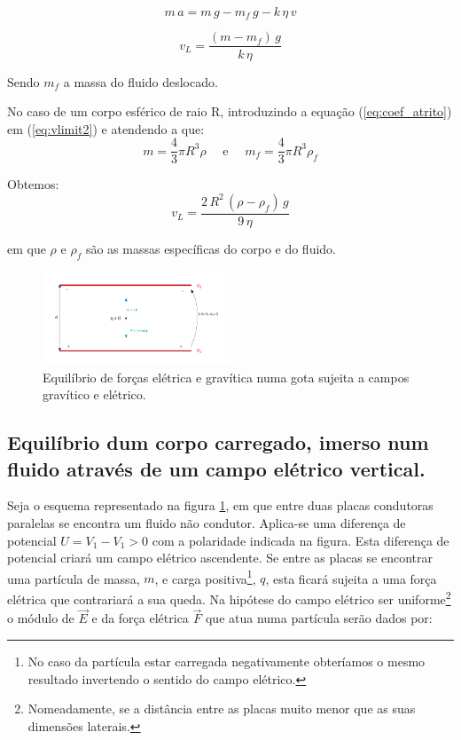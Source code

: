 \documentclass[a4paper,twoside,12pt]{article}      %
\begin{document}
\begin{equation}
	\label{eq:mov2}
	m\,a = m\,g - m_f\,g  - k  \, \eta \, v
\end{equation}


\begin{equation}
	\label{eq:vlimit2}
	v_L = \frac{(m - m_f)\,g}{k  \, \eta}
\end{equation}

Sendo $m_f$ a massa do fluido deslocado.

No caso de um corpo esférico de raio R, introduzindo a equação (\ref{eq:coef_atrito}) em (\ref{eq:vlimit2}) e atendendo a que:
\begin{equation*}
	m = \frac{4}{3} \pi R^3 \rho \quad \textrm{  e } \quad  m_f = \frac{4}{3} \pi R^3 \rho_f
\end{equation*}

Obtemos:
\begin{equation}
	\label{eq:vlimit3}
	v_L = \frac{2\,R^2\, (\rho - \rho_f)\,g}{9  \, \eta}
\end{equation}

em que $\rho$  e $\rho_f$ são as massas específicas do corpo e do fluido.

%


\begin{figure}
	[tb]  \centering 
	\includegraphics[width=0.5\textwidth]{./F_equil}
	\caption{Equilíbrio de forças elétrica e gravítica numa gota sujeita a campos gravítico e elétrico. \label{fig:f_equil}} 
\end{figure}


\subsection{\sf Equilíbrio dum corpo carregado, imerso num fluido através de um campo elétrico vertical.}

Seja o esquema representado na figura \ref{fig:f_equil}, em que entre duas placas condutoras paralelas se encontra um fluido não condutor. Aplica-se uma diferença de potencial \mbox{$U = V_1 -V_1 > 0$} com a polaridade indicada na figura. Esta diferença de potencial criará um campo elétrico ascendente. Se entre as placas se encontrar uma partícula de massa, $m$, e carga positiva\footnote{No caso da partícula estar carregada negativamente obteríamos o mesmo resultado invertendo o sentido do campo elétrico.}, $q$,  esta ficará sujeita a uma força elétrica que contrariará a sua queda.
Na hipótese do campo elétrico ser uniforme\footnote{Nomeadamente, se a distância entre as placas muito menor que as suas dimensões laterais.} o módulo de $\vec{E}$ e da força elétrica $\vec{F}$ que atua numa partícula serão dados por:
\end{document}
